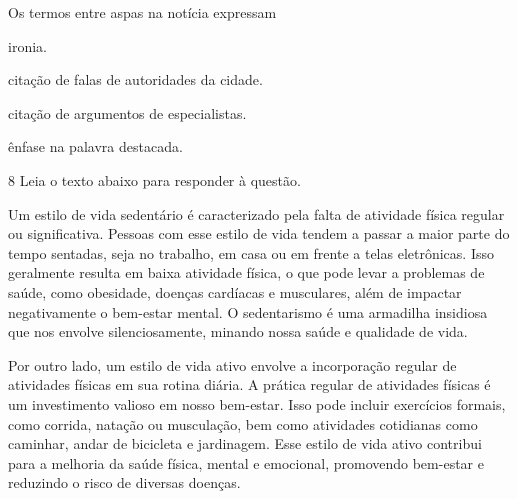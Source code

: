 Os termos entre aspas na notícia expressam

\begin{escolha}
    
    \item ironia. 
    
    \item citação de falas de autoridades da cidade.
    
    \item citação de argumentos de especialistas.
    
    \item ênfase na palavra destacada.

\end{escolha}

\num{8} Leia o texto abaixo para responder à questão. 

\begin{myquote}





Um estilo de vida sedentário é caracterizado pela falta de atividade física
regular ou significativa. Pessoas com esse estilo de vida tendem a passar a
maior parte do tempo sentadas, seja no trabalho, em casa ou em frente a telas
eletrônicas. Isso geralmente resulta em baixa atividade física, o que pode
levar a problemas de saúde, como obesidade, doenças cardíacas e musculares,
além de impactar negativamente o bem-estar mental. O sedentarismo é uma
armadilha insidiosa que nos envolve silenciosamente, minando nossa saúde e
qualidade de vida.

Por outro lado, um estilo de vida ativo envolve a incorporação regular de
atividades físicas em sua rotina diária. A prática regular de atividades
físicas é um investimento valioso em nosso bem-estar. Isso pode incluir
exercícios formais, como corrida, natação ou musculação, bem como atividades
cotidianas como caminhar, andar de bicicleta e jardinagem. Esse estilo de vida
ativo contribui para a melhoria da saúde física, mental e emocional,
promovendo bem-estar e reduzindo o risco de diversas doenças.


\end{myquote}

